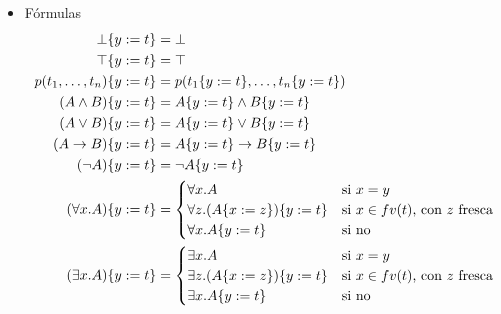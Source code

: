 \begin{definition}
\begin{itemize}
        \item Fórmulas
        \begin{align*}    
            \bot\{y := t\} &= \bot\\
            \top\{y := t\} &= \top\\
            p(t_1, \dots, t_n)\{y := t\} &=
            p(
                    t_1\{y := t\},
                    \dots,
                    t_n\{y := t\}
                )
            \\
            (A \wedge B)\{y := t\} &= 
                A\{y := t\} \wedge B\{y := t\}\\
            (A \vee B)\{y := t\} &=
            A\{y := t\} \vee B\{y := t\}\\
            (A \to B)\{y := t\} &=
            A\{y := t\} \to B\{y := t\}\\
            (\neg A)\{y := t\} &=
                \neg A\{y := t\}\\
            (\forall x . A)\{y := t\} &=
            \begin{cases}
                \forall x . A
                    &\text{si } x = y\\
                \forall z . (A\{x := z\})\{y := t\}
                    &\text{si } x \in fv(t) \text{, con } z \text{ fresca}\\
                \forall x . A\{y := t\}
                    &\text{si no}
            \end{cases}
            \\
            (\exists x . A)\{y := t\} &=
            \begin{cases}
                \exists x . A
                    &\text{si } x = y\\
                \exists z . (A\{x := z\})\{y := t\}
                    &\text{si } x \in fv(t) \text{, con } z \text{ fresca}\\
                \exists x . A\{y := t\}
                    &\text{si no}
            \end{cases}
        \end{align*}

    \end{itemize}
\end{definition}

